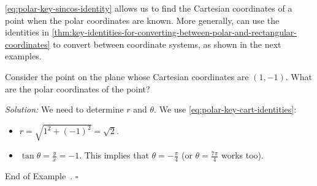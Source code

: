 \documentclass[10pt]{article}
\theoremstyle{definition}
\newtheorem{example}[theorem]{Example}
\renewenvironment{example}
{\begin{oldexample}}
  {\par\smallskip\hfill   End of Example~\theexample. $\square$    \par\end{oldexample}}
\newcommand{\Fli}{\vskip 2mm\noindent\textit} %
\newcommand{\1}[1]{\textbf{1}_{\left[#1\right]}} %
\begin{document}
\cref{eq:polar-key-sincos-identity} allows us to find the Cartesian coordinates
of a point when the polar coordinates are known. More generally, can use the
identities in
\cref{thm:key-identities-for-converting-between-polar-and-rectangular-coordinates}
to convert between coordinate systems, as shown in the next examples.

\begin{example}
  Consider the point on the plane whose Cartesian coordinates are $(1,-1)$. What
  are the polar coordinates of the point?


  \begin{center}
  \end{center}

  \Fli{Solution:} We need to determine $r$ and $\theta$. We use \cref{eq:polar-key-cart-identities}:
  \begin{itemize}
    \item $r = \sqrt{1^{2}+(-1)^{2}}=\sqrt{2}$. 
    \item $\tan\theta = \frac{y}{x} = -1$. This implies that
    $\theta=-\frac{\pi}{4}$ (or $\theta=\frac{7\pi}{4}$ works too).
  \end{itemize}
\end{example}
\end{document}
